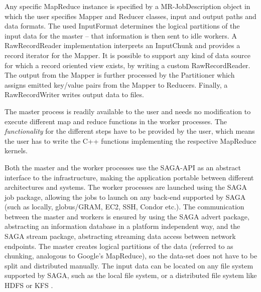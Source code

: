 \documentclass[3p,twocolumn]{elsarticle}
\begin{document}
Any specific MapReduce instance
is specified by a MR-JobDescription object in which the user specifies 
Mapper and Reducer classes, input and output paths and data formats.  The
used InputFormat determines the logical partitions of the input data for
the master -- that information is then sent to idle workers.  A
Raw\-Record\-Reader implementation interprets an
InputChunk and provides a record iterator for the Mapper. It is
possible to support any kind of data source for which a record
oriented view exists, by writing a custom Raw\-Record\-Reader.
The output from the Mapper is further processed by the Partitioner
which assigns emitted key/value pairs from the Mapper to Reducers.
Finally, a Raw\-Record\-Writer writes output data to files.

The master process is readily available to the user and needs no
modification to execute different map and reduce functions in the
worker processes.
The \textit{functionality} for the different steps have to be provided by
the user, which means the user has to write the C++ functions
implementing the respective MapReduce kernels.

Both the master and the worker processes use the SAGA-API as an
abstract interface to the  infrastructure, making the application
portable between different architectures and systems.  The worker
processes are launched using the SAGA job package, allowing the jobs
to launch on any back-end supported by SAGA (such as locally, globus/GRAM, 
EC2, SSH, Condor etc.).  The communication between the master and workers
is ensured by using the SAGA advert package, abstracting an
information database in a platform independent way, and the SAGA stream
package, abstracting streaming data access between network endpoints.
The master creates logical partitions of the data (referred to as chunking,
analogous to Google's MapReduce), so the data-set does not have to be split
and distributed manually.  The input data can be located on any file system
supported by SAGA, such as the local file system, or a distributed file system
like HDFS or KFS \cite{KFS}.
\end{document}
